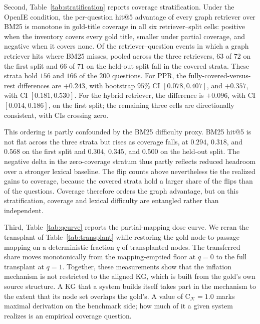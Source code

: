 \documentclass[11pt]{article}
\newcommand{\C}{\mathrm{C}}
\newcommand{\kg}{\mathcal{K}}
\begin{document}
Second, Table~\ref{tab:stratification} reports coverage stratification. Under the OpenIE condition, the per-question hit@5 advantage of every graph retriever over BM25 is monotone in gold-title coverage in all six retriever--split cells: positive when the inventory covers every gold title, smaller under partial coverage, and negative when it covers none. Of the retriever--question events in which a graph retriever hits where BM25 misses, pooled across the three retrievers, $63$ of $72$ on the first split and $66$ of $71$ on the held-out split fall in the covered strata. These strata hold $156$ and $166$ of the $200$ questions. For PPR, the fully-covered-versus-rest differences are $+0.243$, with bootstrap $95\%$ CI $[0.078,0.407]$, and $+0.357$, with CI $[0.181,0.530]$. For the hybrid retriever, the difference is $+0.096$, with CI $[0.014,0.186]$, on the first split; the remaining three cells are directionally consistent, with CIs crossing zero.

This ordering is partly confounded by the BM25 difficulty proxy. BM25 hit@5 is not flat across the three strata but rises as coverage falls, at $0.294$, $0.318$, and $0.568$ on the first split and $0.304$, $0.345$, and $0.500$ on the held-out split. The negative delta in the zero-coverage stratum thus partly reflects reduced headroom over a stronger lexical baseline. The flip counts above nevertheless tie the realized gains to coverage, because the covered strata hold a larger share of the flips than of the questions. Coverage therefore orders the graph advantage, but on this stratification, coverage and lexical difficulty are entangled rather than independent.

Third, Table~\ref{tab:qcurve} reports the partial-mapping dose curve. We reran the transplant of Table~\ref{tab:transplant} while restoring the gold node-to-passage mapping on a deterministic fraction $q$ of transplanted nodes. The transferred share moves monotonically from the mapping-emptied floor at $q{=}0$ to the full transplant at $q{=}1$. Together, these measurements show that the inflation mechanism is not restricted to the aligned KG, which is built from the gold's own source structure. A KG that a system builds itself takes part in the mechanism to the extent that its node set overlaps the gold's. A value of $\C_{\kg}=1.0$ marks maximal derivation on the benchmark side; how much of it a given system realizes is an empirical coverage question.
\end{document}
